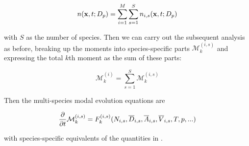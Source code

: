 \begin{equation}\labeleq{modal_multi_species}
  n(\vec{x}, t; D_p) = \sum_{i=1}^M \sum_{s=1}^S n_{i,s}(\vec{x}, t; D_p)
\end{equation}

with $S$ as the number of species. Then we can carry out the subsequent analysis
as before, breaking up the moments into species-specific parts
$\mathcal{M}_k^{(i,s)}$ and expressing the total $k$th moment as the sum of these
parts:

\begin{equation}
  \mathcal{M}_k^{(i)} = \sum_{s=1}^S \mathcal{M}_k^{(i,s)}
\end{equation}

Then the multi-species modal evolution equations are

\begin{equation}\labeleq{modal_multi_species_evolution}
  \ddt\mathcal{M}_k^{(i,s)} = F_k^{(i,s)}(N_{i,s}, \overline{D}_{i,s}, \overline{A}_{i,s}, \overline{V}_{i,s}, T, p, \mathsf{...})
\end{equation}

with species-specific equivalents of the quantities in .

